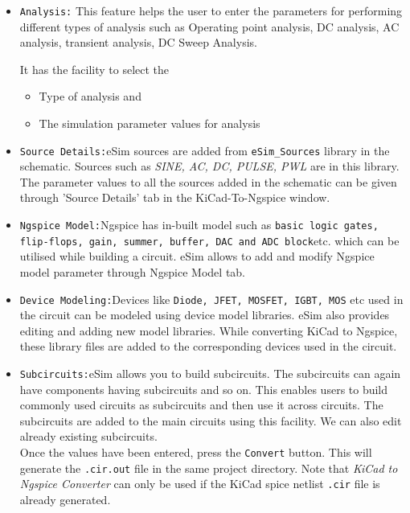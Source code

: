\begin{itemize}
\item \texttt{Analysis:} This feature helps the user to enter the parameters for performing different types of analysis such as Operating point analysis,  DC analysis,  AC analysis,  transient analysis,  DC Sweep Analysis. 

It has the facility to select the
\begin{itemize}
    \item Type of analysis and
    \item The simulation parameter values for analysis
\end{itemize}

\item \texttt{Source Details:}eSim sources are added from {\tt eSim\_Sources} library in the schematic. Sources such as \textit{SINE, AC, DC, PULSE, PWL} are in this library. The parameter values to all the sources added in the schematic can 
be given through 'Source Details' tab in the KiCad-To-Ngspice window.

\item \texttt{Ngspice Model:}Ngspice has in-built model such as \texttt{basic logic gates, flip-flops, gain, summer, buffer, DAC and ADC block}etc. which can be utilised while building a circuit.
eSim allows to add and modify Ngspice model parameter through 
Ngspice Model tab.

\item \texttt{Device Modeling:}Devices like \texttt{Diode, JFET, MOSFET, IGBT, MOS} etc used in 
the circuit can be modeled using device model libraries. eSim also 
provides editing and adding new model libraries. While converting 
KiCad to Ngspice, these library files are added to the corresponding 
devices used in the circuit.

\item \texttt{Subcircuits:}eSim allows you to build subcircuits.  The subcircuits can again 
have components having subcircuits and so on. This enables users to 
build commonly used circuits as subcircuits and then use it across 
circuits. The subcircuits are added to the main circuits using this 
facility. We can also edit already existing subcircuits. 
\\
Once the values have been entered, press the {\tt Convert} button. This 
will generate the {\tt .cir.out} file in the same project directory.
Note that \textit{KiCad to Ngspice Converter} can only be used if 
the KiCad spice netlist {\tt .cir} file is already generated.
\\
\end{itemize}

